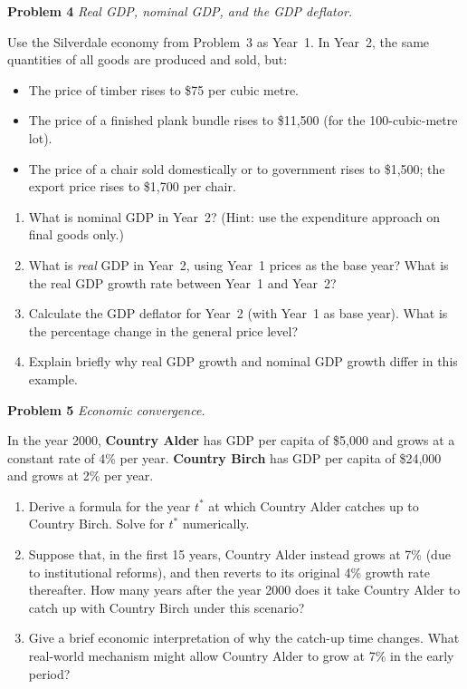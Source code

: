 \documentclass[12pt]{article}
\begin{document}
\noindent\textbf{Problem 4} \quad \textit{Real GDP, nominal GDP, and the GDP deflator.}

\medskip
Use the Silverdale economy from Problem~3 as Year~1.
In Year~2, the same quantities of all goods are produced and sold, but:
\begin{itemize}[leftmargin=1.5em,itemsep=3pt]
  \item The price of timber rises to \$75 per cubic metre.
  \item The price of a finished plank bundle rises to \$11{,}500 (for the
        100-cubic-metre lot).
  \item The price of a chair sold domestically or to government rises
        to \$1{,}500; the export price rises to \$1{,}700 per chair.
\end{itemize}

\begin{enumerate}[label=(\alph*),leftmargin=2em,itemsep=4pt]
  \item What is nominal GDP in Year~2?
        (Hint: use the expenditure approach on final goods only.)
  \item What is \emph{real} GDP in Year~2, using Year~1 prices as the
        base year?  What is the real GDP growth rate between Year~1 and
        Year~2?
  \item Calculate the GDP deflator for Year~2 (with Year~1 as base year).
        What is the percentage change in the general price level?
  \item Explain briefly why real GDP growth and nominal GDP growth differ
        in this example.
\end{enumerate}

\bigskip

\noindent\textbf{Problem 5} \quad \textit{Economic convergence.}

\medskip
In the year 2000, \textbf{Country Alder} has GDP per capita of
\$5{,}000 and grows at a constant rate of 4\% per year.
\textbf{Country Birch} has GDP per capita of \$24{,}000 and grows at
2\% per year.

\begin{enumerate}[label=(\alph*),leftmargin=2em,itemsep=4pt]
  \item Derive a formula for the year $t^*$ at which Country Alder
        catches up to Country Birch.  Solve for $t^*$ numerically.

  \item Suppose that, in the first 15 years, Country Alder instead
        grows at 7\% (due to institutional reforms), and then reverts
        to its original 4\% growth rate thereafter.  How many years after
        the year 2000 does it take Country Alder to catch up with
        Country Birch under this scenario?

  \item Give a brief economic interpretation of why the catch-up time
        changes.  What real-world mechanism might allow Country Alder to
        grow at 7\% in the early period?
\end{enumerate}
\end{document}
